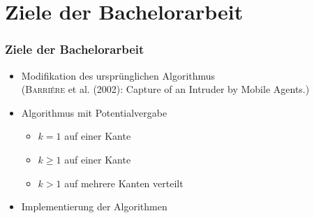 \documentclass{beamer}
\begin{document}
	{%
		\begin{frame}[plain]
			
			
		\end{frame}
	}%
	

	\section{Ziele der Bachelorarbeit}
	\begin{frame}
		\frametitle{Ziele der Bachelorarbeit}
		\large
		
		\begin{itemize}
			\item Modifikation des ursprünglichen Algorithmus\\
				(\textsc{Barriére} et al. (2002): Capture of an Intruder by Mobile Agents.)
			
			\item Algorithmus mit Potentialvergabe
			
			\begin{itemize}
				\item $k = 1$ auf einer Kante
				
				\item $k \geq 1$ auf einer Kante
				
				\item $k > 1$ auf mehrere Kanten verteilt
			\end{itemize}
			
			\item Implementierung der Algorithmen
			
		\end{itemize}
		
	\end{frame}
	
\end{document}

